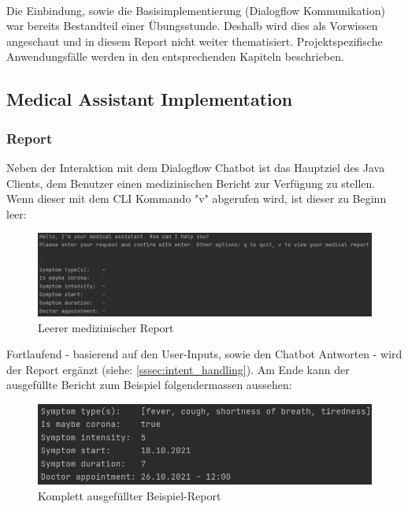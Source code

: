 \documentclass[11pt,a4paper]{article}
\begin{document}
		\paragraph{}
		Die Einbindung, sowie die Basisimplementierung (Dialogflow Kommunikation) war bereits Bestandteil einer Übungsstunde. Deshalb wird dies als Vorwissen angeschaut und in diesem Report nicht weiter thematisiert. Projektspezifische Anwendungsfälle werden in den entsprechenden Kapiteln beschrieben.
	
	\subsection{Medical Assistant Implementation}
		\subsubsection{Report}
			Neben der Interaktion mit dem Dialogflow Chatbot ist das Hauptziel des Java Clients, dem Benutzer einen medizinischen Bericht zur Verfügung zu stellen. Wenn dieser mit dem CLI Kommando "v" abgerufen wird, ist dieser zu Beginn leer:
			\begin{figure}[h!]
				\begin{center}
            		\includegraphics[width=0.85\linewidth]{JavaClient-EmptyReport.png}
		            \caption{Leerer medizinischer Report}
		            \label{fig:javaClient_emptyReport}
				\end{center}
	        \end{figure}
	        
	        Fortlaufend - basierend auf den User-Inputs, sowie den Chatbot Antworten - wird der Report ergänzt (siehe: \ref{sssec:intent_handling}). Am Ende kann der ausgefüllte Bericht zum Beispiel folgendermassen aussehen:
			\begin{figure}[h!]
				\begin{center}
            		\includegraphics[width=0.65\linewidth]{JavaClient-CompletedReport.png}
		            \caption{Komplett ausgefüllter Beispiel-Report}
		            \label{fig:javaClient_completedReport}
				\end{center}
	        \end{figure}
		
\end{document}
